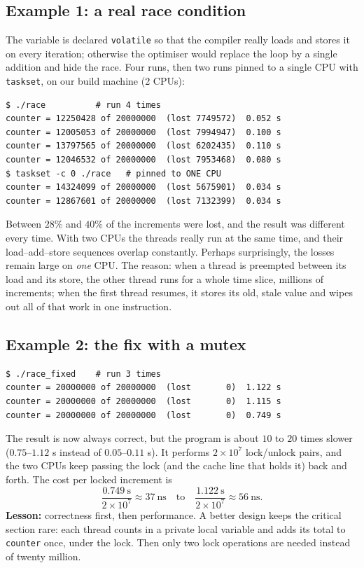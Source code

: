 \documentclass[11pt,a4paper]{article}
\newcommand{\cmd}[1]{\texttt{#1}}
\begin{document}
\subsection{Example 1: a real race condition}



The variable is declared \texttt{volatile} so that the compiler really loads and stores it on every iteration; otherwise the optimiser would replace the loop by a single addition and hide the race. Four runs, then two runs pinned to a single CPU with \cmd{taskset}, on our build machine (2 CPUs):

\begin{lstlisting}[style=term]
$ ./race          # run 4 times
counter = 12250428 of 20000000  (lost 7749572)  0.052 s
counter = 12005053 of 20000000  (lost 7994947)  0.100 s
counter = 13797565 of 20000000  (lost 6202435)  0.110 s
counter = 12046532 of 20000000  (lost 7953468)  0.080 s
$ taskset -c 0 ./race   # pinned to ONE CPU
counter = 14324099 of 20000000  (lost 5675901)  0.034 s
counter = 12867601 of 20000000  (lost 7132399)  0.034 s
\end{lstlisting}

Between $28\%$ and $40\%$ of the increments were lost, and the result was different every time. With two CPUs the threads really run at the same time, and their load--add--store sequences overlap constantly. Perhaps surprisingly, the losses remain large on \emph{one} CPU. The reason: when a thread is preempted between its load and its store, the other thread runs for a whole time slice, millions of increments; when the first thread resumes, it stores its old, stale value and wipes out all of that work in one instruction.

\subsection{Example 2: the fix with a mutex}



\begin{lstlisting}[style=term]
$ ./race_fixed    # run 3 times
counter = 20000000 of 20000000  (lost       0)  1.122 s
counter = 20000000 of 20000000  (lost       0)  1.115 s
counter = 20000000 of 20000000  (lost       0)  0.749 s
\end{lstlisting}

The result is now always correct, but the program is about $10$ to $20$ times slower ($0.75$--$1.12$ s instead of $0.05$--$0.11$ s). It performs $2\times10^{7}$ lock/unlock pairs, and the two CPUs keep passing the lock (and the cache line that holds it) back and forth. The cost per locked increment is
\[
\frac{0.749\ \text{s}}{2\times10^{7}} \approx 37\ \text{ns} \quad\text{to}\quad \frac{1.122\ \text{s}}{2\times10^{7}} \approx 56\ \text{ns}.
\]
\textbf{Lesson:} correctness first, then performance. A better design keeps the critical section rare: each thread counts in a private local variable and adds its total to \texttt{counter} once, under the lock. Then only two lock operations are needed instead of twenty million.
\end{document}
